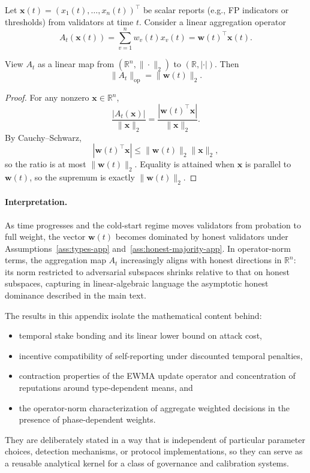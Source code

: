 \documentclass[11pt]{article}
\begin{document}
Let \(\bm{x}(t) = (x_1(t),\dots,x_n(t))^\top\) be scalar reports (e.g., FP indicators or thresholds) from validators at time \(t\). Consider a linear aggregation operator
\[
A_t(\bm{x}(t)) = \sum_{v=1}^n w_v(t)x_v(t) = \bm{w}(t)^\top \bm{x}(t).
\]

\begin{lemma}
\label{lem:aggregation-op-app}
View \(A_t\) as a linear map from \((\mathbb{R}^n,\|\cdot\|_2)\) to \((\mathbb{R},|\cdot|)\). Then
\[
\|A_t\|_{\mathrm{op}} = \|\bm{w}(t)\|_2.
\]
\end{lemma}

\begin{proof}
For any nonzero \(\bm{x} \in \mathbb{R}^n\),
\[
\frac{|A_t(\bm{x})|}{\|\bm{x}\|_2}
= \frac{|\bm{w}(t)^\top \bm{x}|}{\|\bm{x}\|_2}.
\]
By Cauchy–Schwarz,
\[
|\bm{w}(t)^\top \bm{x}|
\le \|\bm{w}(t)\|_2\|\bm{x}\|_2,
\]
so the ratio is at most \(\|\bm{w}(t)\|_2\). Equality is attained when \(\bm{x}\) is parallel to \(\bm{w}(t)\), so the supremum is exactly \(\|\bm{w}(t)\|_2\).
\end{proof}

\paragraph{Interpretation.}
As time progresses and the cold-start regime moves validators from probation to full weight, the vector \(\bm{w}(t)\) becomes dominated by honest validators under Assumptions~\ref{ass:types-app} and~\ref{ass:honest-majority-app}. In operator-norm terms, the aggregation map \(A_t\) increasingly aligns with honest directions in \(\mathbb{R}^n\): its norm restricted to adversarial subspaces shrinks relative to that on honest subspaces, capturing in linear-algebraic language the asymptotic honest dominance described in the main text.

\bigskip

The results in this appendix isolate the mathematical content behind:
\begin{itemize}[leftmargin=*]
  \item temporal stake bonding and its linear lower bound on attack cost,
  \item incentive compatibility of self-reporting under discounted temporal penalties,
  \item contraction properties of the EWMA update operator and concentration of reputations around type-dependent means, and
  \item the operator-norm characterization of aggregate weighted decisions in the presence of phase-dependent weights.
\end{itemize}
They are deliberately stated in a way that is independent of particular parameter choices, detection mechanisms, or protocol implementations, so they can serve as a reusable analytical kernel for a class of governance and calibration systems.

\nocite{*}
  
  
\end{document}
